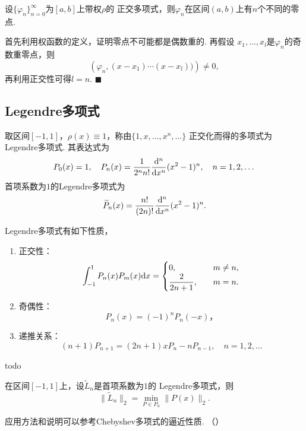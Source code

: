   \begin{thm}
    设$\{\varphi_n\}_{n=0}^\infty$为$[a, b]$上带权$\rho$的
    正交多项式，则$\varphi_n$在区间$(a, b)$上有$n$个不同的零点.
  \end{thm}
  \proof
    首先利用权函数的定义，证明零点不可能都是偶数重的. 再假设
    $x_1,\dots,x_l$是$\varphi_n$的奇数重零点，则
    \[
      \left(\varphi_n, (x-x_1)\cdots(x-x_l)) \right) \ne 0,
    \]
    再利用正交性可得$l=n$. $\blacksquare$

\newpage
\subsection{Legendre多项式}
  \begin{defi}[Legendre多项式]
    取区间$[-1, 1]$，$\rho(x)\equiv1$，称由$\{1,x,\dots,x^n,\dots\}$
    正交化而得的多项式为Legendre多项式. 其表达式为
    \[
      P_0(x) = 1,\quad
      P_n(x) = \frac{1}{2^nn!}\frac{\mathrm{d}^n}{\mathrm{d} x^n}(x^2-1)^n,
      \quad n=1,2,\dots
    \]
    首项系数为$1$的Legendre多项式为
    \[
      \widetilde{P}_n(x) = \frac{n!}{(2n)!}\frac{\mathrm{d}^n}{\mathrm{d} x^n}(x^2-1)^n.
    \]
  \end{defi}

  \begin{thm}[Legendre多项式的性质]
    Legendre多项式有如下性质，
    \begin{enumerate}
      \item 正交性：
      \[
        \int_{-1}^1 P_n(x)P_m(x)\mathrm{d} x =
        \begin{cases}
            0, &\quad m\ne n, \\
            \dfrac{2}{2n+1},&\quad m = n.
        \end{cases}
      \]
      \item 奇偶性：
        \[P_n(x) = (-1)^nP_n(-x)，\]
      \item 递推关系：
      \[
        (n+1)P_{n+1} = (2n+1)xP_n - nP_{n-1},\quad
        n = 1, 2,\dots
      \]
    \end{enumerate}
  \end{thm}
  \proof todo

  \begin{thm}[Legendre多项式的逼近性质]
    \label{thm: Legendre多项式的逼近性质}
    在区间$[-1, 1]$上，设$\widetilde{L}_n$是首项系数为$1$的
    Legendre多项式，则
    \[
      \|\widetilde{L}_n\|_2 = \min_{P\in P_n}\|P(x)\|_2.
    \]
  \end{thm}
  \remark
    应用方法和说明可以参考Chebyshev多项式的逼近性质.
    （）

